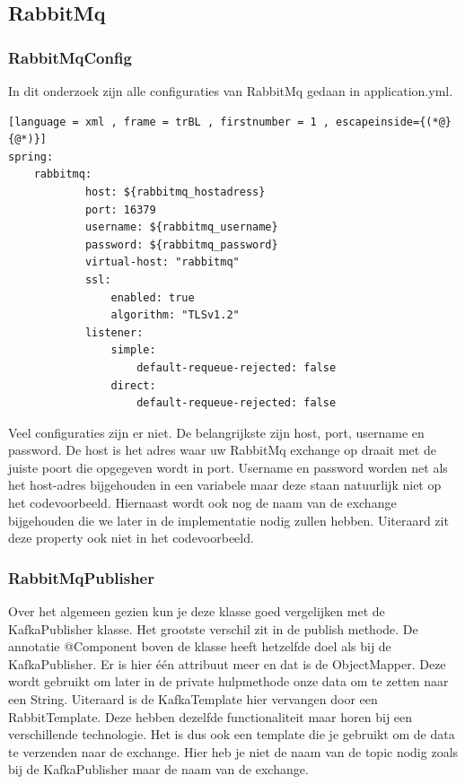 \subsection{RabbitMq}
\subsubsection{RabbitMqConfig}
In dit onderzoek zijn alle configuraties van RabbitMq gedaan in application.yml. 
\begin{lstlisting}[language = xml , frame = trBL , firstnumber = 1 , escapeinside={(*@}{@*)}]
spring:
    rabbitmq:
            host: ${rabbitmq_hostadress}
            port: 16379
            username: ${rabbitmq_username}
            password: ${rabbitmq_password}
            virtual-host: "rabbitmq"
            ssl:
                enabled: true
                algorithm: "TLSv1.2"
            listener:
                simple:
                    default-requeue-rejected: false
                direct:
                    default-requeue-rejected: false
\end{lstlisting}

Veel configuraties zijn er niet. De belangrijkste zijn host, port, username en password. De host is het adres waar uw RabbitMq exchange op draait met de juiste poort die opgegeven wordt in port. Username en password worden net als het host-adres bijgehouden in een variabele maar deze staan natuurlijk niet op het codevoorbeeld. Hiernaast wordt ook nog de naam van de exchange bijgehouden die we later in de implementatie nodig zullen hebben. Uiteraard zit deze property ook niet in het codevoorbeeld.

\subsubsection{RabbitMqPublisher}
Over het algemeen gezien kun je deze klasse goed vergelijken met de KafkaPublisher klasse. Het grootste verschil zit in de publish methode. De annotatie @Component boven de klasse heeft hetzelfde doel als bij de KafkaPublisher. Er is hier één attribuut meer en dat is de ObjectMapper. Deze wordt gebruikt om later in de private hulpmethode onze data om te zetten naar een String. Uiteraard is de KafkaTemplate hier vervangen door een RabbitTemplate. Deze hebben dezelfde functionaliteit maar horen bij een verschillende technologie. Het is dus ook een template die je gebruikt om de data te verzenden naar de exchange. Hier heb je niet de naam van de topic nodig zoals bij de KafkaPublisher maar de naam van de exchange.


